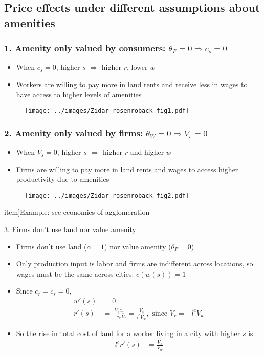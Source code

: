 \documentclass[11pt,notes=hide,aspectratio=169]{beamer}
\begin{document}
\subsection{Price effects under different assumptions about amenities}
\begin{frame}
\frametitle{1. Amenity only valued by consumers: $\theta_F=0 \Rightarrow c_s = 0$}
\begin{itemize}
\item When $c_s = 0$, higher $s$ $\Rightarrow$ higher $r$, lower $w$
\item Workers are willing to pay more in land rents and receive less in wages to have access to higher levels of amenities
\end{itemize}
\begin{figure}
\texttt{[image: ../images/Zidar\_rosenroback\_fig1.pdf]}
\end{figure}
\end{frame}
\begin{frame}
\frametitle{2. Amenity only valued by firms: $\theta_W=0 \Rightarrow  V_s = 0$}
\begin{itemize}
\item When $V_s = 0$, higher $s$ $\Rightarrow$ higher $r$ and higher $w$
\item Firms are willing to pay more in land rents and wages to access higher productivity due to amenities
\end{itemize}
\begin{figure}
\texttt{[image: ../images/Zidar\_rosenroback\_fig2.pdf]}
\end{figure}
item]{Example: see economies of agglomeration}
\end{frame}
\begin{frame}{3. Firms don't use land nor value amenity}
\begin{itemize}
\item Firms don't use land ($\alpha=1$) nor value amenity ($\theta_F=0$)
\item Only production input is labor and firms are indifferent across locations, so wages must be the same across cities: $c(w(s))=1$\\$\;$\\
\item Since  $c_r = c_s = 0$, 
\begin{align*}
w'(s) &= 0 \\
r'(s) &= \frac{V_sc_w}{- c_wV_r} = \frac{V_s}{ l^c V_w}, \text{ since } V_r = -l^c V_w
\end{align*} 
\item So the rise in total cost of land for a worker living in a city with higher $s$ is 
\begin{align*}
l^c r'(s) &=  \frac{V_s}{ V_w}
\end{align*} 
\end{itemize}
\end{frame}
\end{document}
